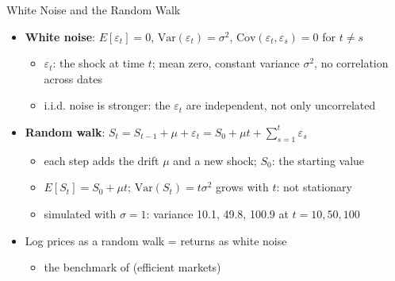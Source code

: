 \begin{frame}{White Noise and the Random Walk}
\itemsize{\footnotesize}
\begin{itemize}
    \item \textbf{White noise}: $E[\varepsilon_t] = 0$, $\text{Var}(\varepsilon_t) = \sigma^2$, $\text{Cov}(\varepsilon_t, \varepsilon_s) = 0$ for $t \ne s$
    \begin{itemize}
        \item $\varepsilon_t$: the shock at time $t$; mean zero, constant variance $\sigma^2$, no correlation across dates
        \item i.i.d. noise is stronger: the $\varepsilon_t$ are independent, not only uncorrelated
    \end{itemize}
    \item \textbf{Random walk}: $S_t = S_{t-1} + \mu + \varepsilon_t = S_0 + \mu t + \sum_{s=1}^t \varepsilon_s$
    \begin{itemize}
        \item each step adds the drift $\mu$ and a new shock; $S_0$: the starting value
        \item $E[S_t] = S_0 + \mu t$; $\text{Var}(S_t) = t\sigma^2$ grows with $t$: not stationary
        \item simulated with $\sigma = 1$: variance 10.1, 49.8, 100.9 at $t = 10, 50, 100$
    \end{itemize}
    \item Log prices as a random walk = returns as white noise
    \begin{itemize}
        \item the benchmark of  (efficient markets)
    \end{itemize}
\end{itemize}
\end{frame}

